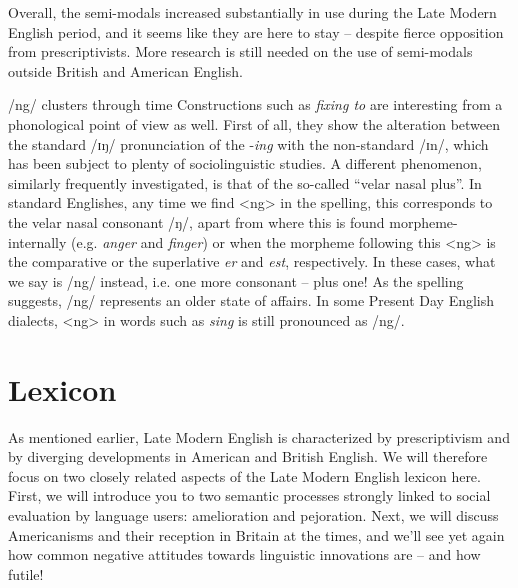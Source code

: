 Overall, the semi-modals increased substantially in use during the Late Modern English period, and it seems like they are here to stay -- despite fierce opposition from prescriptivists. More research is still needed on the use of semi-modals outside British and American English.


\begin{soundbox}{/ng/ clusters through time}
Constructions such as \textit{fixing to} are interesting from a phonological point of view as well. First of all, they show the alteration between the standard /ɪŋ/ pronunciation of the -\textit{ing}  with the non-standard /ɪn/, which has been subject to plenty of sociolinguistic studies. A different phenomenon, similarly frequently investigated, is that of the so-called ``velar nasal plus''. In standard Englishes, any time we find <ng> in the spelling, this corresponds to the velar nasal consonant /ŋ/, apart from where this is found morpheme-internally (e.g. \textit{anger} and \textit{finger}) or when the morpheme following this <ng> is the comparative or the superlative \textit{er} and \textit{est}, respectively. In these cases, what we say is /ng/ instead, i.e. one more consonant -- plus one! As the spelling suggests, /ng/ represents an older state of affairs. In some Present Day English dialects, <ng> in words such as \textit{sing} is still pronounced as /ng/.
\end{soundbox}


\section{Lexicon}
As mentioned earlier, Late Modern English is characterized by prescriptivism and by diverging developments in American and British English. We will therefore focus on two closely related aspects of the Late Modern English lexicon here. First, we will introduce you to two semantic processes strongly linked to social evaluation by language users: amelioration and pejoration. Next, we will discuss Americanisms and their reception in Britain at the times, and we'll see yet again how common negative attitudes towards linguistic innovations are -- and how futile!

